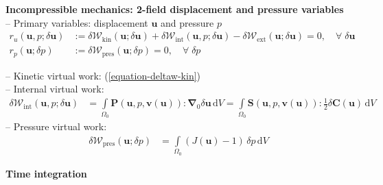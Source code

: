 \documentclass[a4paper,12pt]{report}
\newcommand{\bs}[1]{\boldsymbol{#1}}
\newcommand{\Om}{\mathit{\Omega}}
\begin{document}
\begin{itemize}
\end{itemize}

\textbf{Incompressible mechanics: 2-field displacement and pressure variables}\\

-- Primary variables: displacement $\bs{u}$ and pressure $p$
\begin{equation}
\label{equation-solid-weak-form-inc}
\begin{aligned}
r_u(\bs{u},p;\delta\bs{u}) &:= \delta \mathcal{W}_{\mathrm{kin}}(\bs{u};\delta\bs{u}) + \delta \mathcal{W}_{\mathrm{int}}(\bs{u},p;\delta\bs{u}) - \delta \mathcal{W}_{\mathrm{ext}}(\bs{u};\delta\bs{u}) = 0, \quad \forall \; \delta\bs{u} \\
r_p(\bs{u};\delta p) &:= \delta \mathcal{W}_{\mathrm{pres}}(\bs{u};\delta p) = 0, \quad \forall \; \delta p
\end{aligned}
\end{equation}

-- Kinetic virtual work: (\ref{equation-deltaw-kin})\\
-- Internal virtual work:
\begin{equation}
\label{equation-deltaw-int-inc}
\begin{aligned}
\delta \mathcal{W}_{\mathrm{int}}(\bs{u},p;\delta\bs{u}) &= \int\limits_{\Om_{0}} \bs{P}(\bs{u},p,\bs{v}(\bs{u})) : \bs{\nabla}_{0} \delta\bs{u} \,\mathrm{d}V = \int\limits_{\Om_{0}} \bs{S}(\bs{u},p,\bs{v}(\bs{u})) : \frac{1}{2}\delta\bs{C}(\bs{u}) \,\mathrm{d}V
\end{aligned}
\end{equation}
-- Pressure virtual work:
\begin{equation}
\label{equation-deltaw-p}
\begin{aligned}
\delta \mathcal{W}_{\mathrm{pres}}(\bs{u};\delta p) &= \int\limits_{\Om_{0}} (J(\bs{u}) - 1) \,\delta p \,\mathrm{d}V 
\end{aligned}
\end{equation}

\textbf{Time integration}\\
\end{document}
